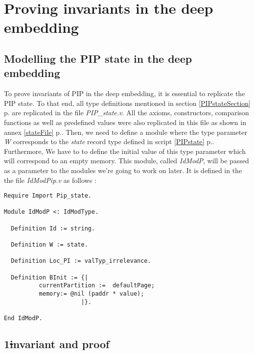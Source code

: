 \chapter{Proving invariants in the deep embedding} \label{Work}

 
\section{Modelling the PIP state in the deep embedding}
To prove invariants of PIP in the deep embedding, it is essential to replicate the PIP state. To that end, all type definitions mentioned in section \ref{PIPstateSection} p.\pageref{PIPstateSection} are replicated in the file \textit{PIP\_state.v}. All the axioms, constructors, comparison functions as well as predefined values were also replicated in this file as shown in annex \ref{stateFile} p.\pageref{stateFile}. Then, we need to define a module where the type parameter \textit{W} corresponds to the \textit{state} record type defined in script \ref{PIPstate} p.\pageref{PIPstate}. Furthermore, We have to to define the initial value of this type parameter which will correspond to an empty memory. This module, called \textit{IdModP}, will be passed as a parameter to the modules we're going to work on later. It is defined in the the file \textit{IdModPip.v} as follows :
\begin{lstlisting}[caption = {Replicating the PIP state in the deep embedding}, xleftmargin=.1\textwidth,
xrightmargin=.1\textwidth]
Require Import Pip_state.

Module IdModP <: IdModType.
 
  Definition Id := string.
  
  Definition W := state.

  Definition Loc_PI := valTyp_irrelevance.

  Definition BInit := {|
          currentPartition :=  defaultPage;
          memory:= @nil (paddr * value);
                      |}.

End IdModP.
\end{lstlisting}

\section{1\st invariant and proof} 

